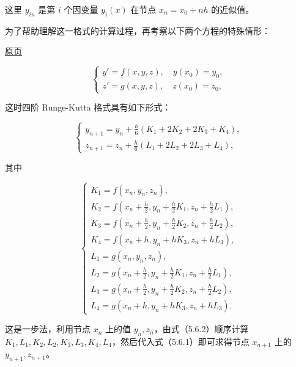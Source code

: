 \documentclass[
  10pt,
  fontset=fandol]{ctexart}
\begin{document}
这里 \(y_{in}\) 是第 \(i\) 个因变量 \(y_i(x)\) 在节点 \(x_n=x_0+nh\) 的近似值。

为了帮助理解这一格式的计算过程，再考察以下两个方程的特殊情形：

\href{../../source-images/pdf-146.jpeg}{原页}

\[
\begin{cases}
y'=f(x,y,z),\quad y(x_0)=y_0,\\
z'=g(x,y,z),\quad z(x_0)=z_0,
\end{cases}
\]

这时四阶 Runge-Kutta 格式具有如下形式：

\[
\begin{cases}
\displaystyle y_{n+1}=y_n+\frac h6(K_1+2K_2+2K_3+K_4),\\[6pt]
\displaystyle z_{n+1}=z_n+\frac h6(L_1+2L_2+2L_3+L_4),
\end{cases}
\tag{5.6.1}
\]

其中

\[
\begin{cases}
K_1=f(x_n,y_n,z_n),\\
\displaystyle K_2=f\left(x_n+\frac h2,y_n+\frac h2K_1,z_n+\frac h2L_1\right),\\[4pt]
\displaystyle K_3=f\left(x_n+\frac h2,y_n+\frac h2K_2,z_n+\frac h2L_2\right),\\[4pt]
K_4=f(x_n+h,y_n+hK_3,z_n+hL_3),\\
L_1=g(x_n,y_n,z_n),\\
\displaystyle L_2=g\left(x_n+\frac h2,y_n+\frac h2K_1,z_n+\frac h2L_1\right),\\[4pt]
\displaystyle L_3=g\left(x_n+\frac h2,y_n+\frac h2K_2,z_n+\frac h2L_2\right),\\[4pt]
L_4=g(x_n+h,y_n+hK_3,z_n+hL_3).
\end{cases}
\tag{5.6.2}
\]

这是一步法，利用节点 \(x_n\) 上的值 \(y_n,z_n\)，由式（5.6.2）顺序计算 \(K_1,\allowbreak L_1,\allowbreak K_2,\allowbreak L_2,\allowbreak K_3,\allowbreak L_3,\allowbreak K_4,\allowbreak L_4\)，然后代入式（5.6.1）即可求得节点 \(x_{n+1}\) 上的 \(y_{n+1},z_{n+1}\)。
\end{document}
